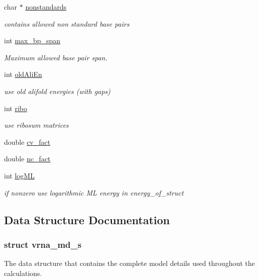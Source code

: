 \begin{DoxyCompactItemize}
char $\ast$ \mbox{\hyperlink{group__model__details_ga2695d91cc535d09c2eae5c3884e2ec64}{nonstandards}}
\begin{DoxyCompactList}\small\item\em contains allowed non standard base pairs \end{DoxyCompactList}\item 
int \mbox{\hyperlink{group__model__details_ga18df869af0d70101106458fc3f027806}{max\+\_\+bp\+\_\+span}}
\begin{DoxyCompactList}\small\item\em Maximum allowed base pair span. \end{DoxyCompactList}\item 
int \mbox{\hyperlink{group__model__details_gac408868ba00671cbc7d1d535105af045}{old\+Ali\+En}}
\begin{DoxyCompactList}\small\item\em use old alifold energies (with gaps) \end{DoxyCompactList}\item 
int \mbox{\hyperlink{group__model__details_ga0656afca1d2853f9ee6591172f5638de}{ribo}}
\begin{DoxyCompactList}\small\item\em use ribosum matrices \end{DoxyCompactList}\item 
double \mbox{\hyperlink{group__model__details_gaf3cbac6ff5d706d6e414677841ddf94c}{cv\+\_\+fact}}
\item 
double \mbox{\hyperlink{group__model__details_ga502948a122a2af5b914355b1f3ea2f61}{nc\+\_\+fact}}
\item 
int \mbox{\hyperlink{group__model__details_ga80c3c5fd35e7479704cc91d2d0367743}{log\+ML}}
\begin{DoxyCompactList}\small\item\em if nonzero use logarithmic ML energy in energy\+\_\+of\+\_\+struct \end{DoxyCompactList}\end{DoxyCompactItemize}


\subsection{Data Structure Documentation}
\label{structvrna__md__s}
\subsubsection{struct vrna\+\_\+md\+\_\+s}
The data structure that contains the complete model details used throughout the calculations. 

